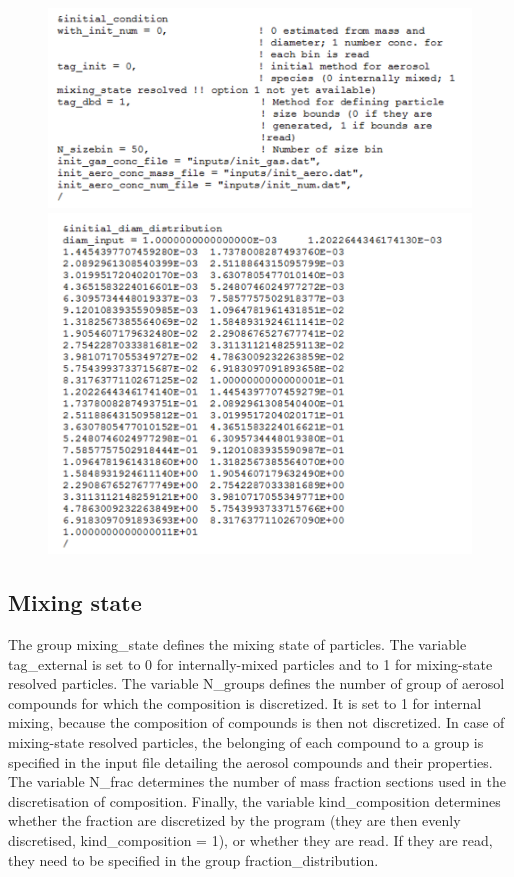 \documentclass[a4paper,11pt]{article}
\begin{document}
\begin{figure}[H]
        \begin{center}
                \includegraphics[angle=0,width=\textwidth]{fig/initialconditions.png}
                \includegraphics[angle=0,width=\textwidth]{fig/initialdiamdistribution.png}
       \end{center}
\end{figure}


\subsection{Mixing state}

The group mixing\_state defines the mixing state of particles. The variable tag\_external is set to 0 for internally-mixed particles and to 1 for mixing-state resolved particles. The variable N\_groups defines the number of group of aerosol compounds for which the composition is discretized. It is set to 1 for internal mixing, because the composition of compounds is then not discretized. In case of mixing-state resolved particles, the belonging of each compound to a group is specified in the input file detailing the aerosol compounds and their properties.
The variable N\_frac determines the number of mass fraction sections used in the discretisation of composition. 
Finally, the variable kind\_composition determines whether the fraction are discretized by the program (they are then evenly discretised, kind\_composition = 1), or whether they are read. If they are read, they need to be specified in the group fraction\_distribution.
\end{document}
